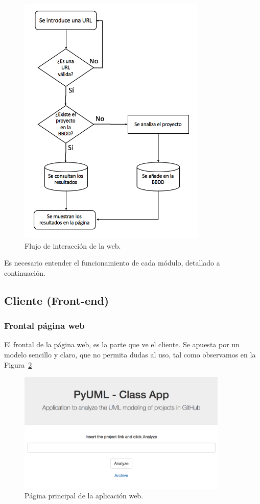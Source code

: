\documentclass[a4paper, 12pt]{book}
\begin{document}
\begin{figure}[htb]
  \centering
  \includegraphics[width=9cm, keepaspectratio]{img/flujoweb}
  \caption{Flujo de interacción de la web.}
  \label{fig:flujoweb}
\end{figure}

Es necesario entender el funcionamiento de cada módulo, detallado a continuación.

\subsection{Cliente (Front-end)}
\label{subsec:cliente}
\subsubsection{Frontal página web}
\label{subsubsec:frontweb}
El frontal de la página web, es la parte que ve el cliente. Se apuesta por un modelo sencillo
y claro, que no permita dudas al uso, tal como observamos en la Figura~\ref{fig:mainpage}

\begin{figure}[htb]
  \centering
  \includegraphics[width=10cm, keepaspectratio]{img/mainpage}
  \caption{Página principal de la aplicación web.}
  \label{fig:mainpage}
\end{figure}
\end{document}
